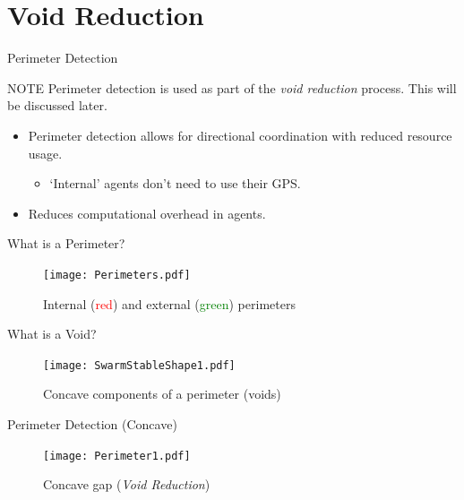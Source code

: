 \documentclass{beamer}
\begin{document}
\section{Void Reduction}


\begin{frame}{Perimeter Detection}
  \begin{block}{NOTE}
    Perimeter detection is used as part of the \textit{void reduction} process. This will be discussed later. 
  \end{block}
  \begin{itemize}
    \item Perimeter detection allows for directional coordination with reduced resource usage.
      \begin{itemize}
        \item `Internal' agents don't need to use their GPS.
      \end{itemize}
    \item Reduces computational overhead in agents.
  \end{itemize}
\end{frame}

\begin{frame}{What is a Perimeter?}
  \begin{figure}
    \begin{center}
      \texttt{[image: Perimeters.pdf]}
    \end{center}
    \caption{Internal (\textcolor{red}{red}) and external (\textcolor{green}{green}) perimeters}
  \end{figure}
\end{frame}

\begin{frame}{What is a Void?}
  \begin{figure}
    \begin{center}
      \texttt{[image: SwarmStableShape1.pdf]}
    \end{center}
    \caption{Concave components of a perimeter (voids)}
  \end{figure}
\end{frame}

\begin{frame}{Perimeter Detection (Concave)}
  \begin{figure}
    \begin{center}
      \texttt{[image: Perimeter1.pdf]}
    \end{center}
    \caption{Concave gap (\textit{Void Reduction})}
  \end{figure}
\end{frame}
\end{document}
